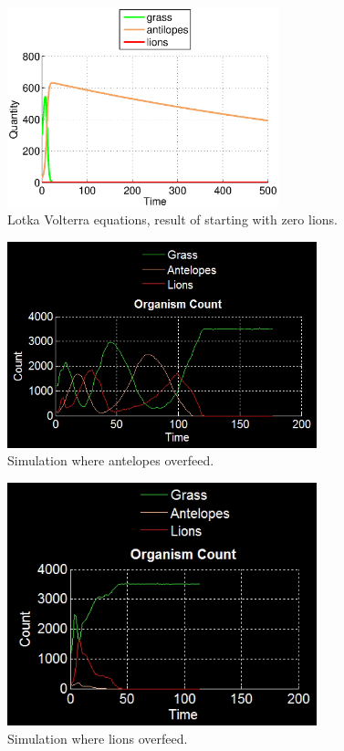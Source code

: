 \documentclass[11pt]{article}
\begin{document}
\begin{figure}
\centering
\includegraphics[width=0.7\textwidth]{LotkaVolterraNoLions.eps}
\caption{Lotka Volterra equations, result of starting with zero lions.}
\label{fig:LotkaNoLions}
\end{figure}

\begin{figure}
\centering
\includegraphics[width=0.8\textwidth]{AnteOverfeed}
\caption{Simulation where antelopes overfeed.}
\label{fig:anteOverfeed}
\end{figure}

\begin{figure}
\centering
\includegraphics[width=0.8\textwidth]{LionsOverfeed}
\caption{Simulation where lions overfeed.}
\label{fig:lionOverfeed}
\end{figure}
\end{document}
